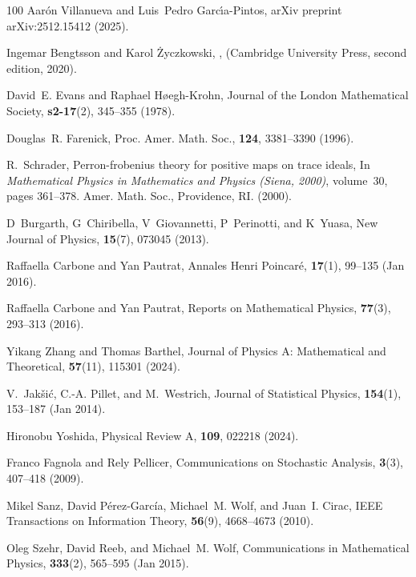 \documentclass[preprint,pteplogo]{ptephy_v2}%
\numberwithin{equation}{section}
\theoremstyle{definition}
\begin{document}
\begin{thebibliography}{100}
Aar{\'o}n Villanueva and Luis~Pedro Garc{\'\i}a-Pintos, arXiv preprint arXiv:2512.15412 (2025).

Ingemar Bengtsson and Karol \.{Z}yczkowski,
,
\newblock  (Cambridge University Press, second edition, 2020).

David~E. Evans and Raphael H{\o}egh-Krohn, Journal of the London Mathematical Society, {\bf s2-17}(2), 345--355 (1978).

Douglas~R. Farenick, Proc. Amer. Math. Soc., {\bf 124}, 3381--3390 (1996).

R.~Schrader,
\newblock Perron-frobenius theory for positive maps on trace ideals,
\newblock In {\em Mathematical Physics in Mathematics and Physics (Siena, 2000)}, volume~30, pages 361--378. Amer. Math. Soc., Providence, RI. (2000).

D~Burgarth, G~Chiribella, V~Giovannetti, P~Perinotti, and K~Yuasa, New Journal of Physics, {\bf 15}(7), 073045 (2013).

Raffaella Carbone and Yan Pautrat, Annales Henri Poincar{\'e}, {\bf 17}(1), 99--135 (Jan 2016).

Raffaella Carbone and Yan Pautrat, Reports on Mathematical Physics, {\bf 77}(3), 293--313 (2016).

Yikang Zhang and Thomas Barthel, Journal of Physics A: Mathematical and Theoretical, {\bf 57}(11), 115301 (2024).

V.~Jak{\v{s}}i{\'{c}}, C.-A. Pillet, and M.~Westrich, Journal of Statistical Physics, {\bf 154}(1), 153--187 (Jan 2014).

Hironobu Yoshida, Physical Review A, {\bf 109}, 022218 (2024).

Franco Fagnola and Rely Pellicer, Communications on Stochastic Analysis, {\bf 3}(3), 407--418 (2009).

Mikel Sanz, David P\'{e}rez-Garc\'{i}a, Michael~M. Wolf, and Juan~I. Cirac, IEEE Transactions on Information Theory, {\bf 56}(9), 4668--4673 (2010).

Oleg Szehr, David Reeb, and Michael~M. Wolf, Communications in Mathematical Physics, {\bf 333}(2), 565--595 (Jan 2015).


\end{thebibliography}
\end{document}
